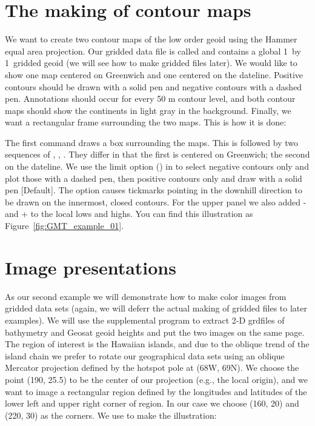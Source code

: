 \section{The making of contour maps}


We want to create two contour maps of the low order geoid
using the Hammer equal area projection.  Our gridded data
file is called  and contains a global 1\DS\ 
by 1\DS\ gridded geoid (we will see how to make gridded
files later).  We would like to show one map centered on
Greenwich and one centered on the dateline.  Positive contours
should be drawn with a solid pen and negative contours with
a dashed pen.  Annotations should occur for every 50 m contour
level, and both contour maps should show the continents in
light gray in the background.  Finally, we want a rectangular
frame surrounding the two maps.  This is how it is done:


The first command draws a box surrounding the maps.  This is
followed by two sequences of
, , .
They differ in that the first is centered on Greenwich; the
second on the dateline.  We use the limit option ()
in  to select negative contours only and plot
those with a dashed pen, then positive contours only and draw
with a solid pen [Default].  The  option causes tickmarks
pointing in the downhill direction to be drawn on the innermost,
closed contours.  For the upper panel we also added - and + to
the local lows and highs.  You can find this illustration as
Figure~\ref{fig:GMT_example_01}.



\section{Image presentations}

As our second example we will demonstrate how to make color
images from gridded data sets (again, we will deferr the
actual making of gridded files to later examples).  We will
use the supplemental program  to extract 2-D
grdfiles of bathymetry and Geosat geoid heights and put the
two images on the same page.  The region of interest is the
Hawaiian islands, and due to the oblique trend of the island
chain we prefer to rotate our geographical data sets using
an oblique Mercator projection defined by the hotspot pole
at (68\DS W, 69\DS N).  We choose the point (190\DS ,
25.5\DS ) to be the center of our projection (e.g., the
local origin), and we want to image a rectangular region
defined by the longitudes and latitudes of the lower left
and upper right corner of region.  In our case we choose
(160\DS , 20\DS ) and (220\DS , 30\DS ) as the
corners.  We use  to make the illustration:

